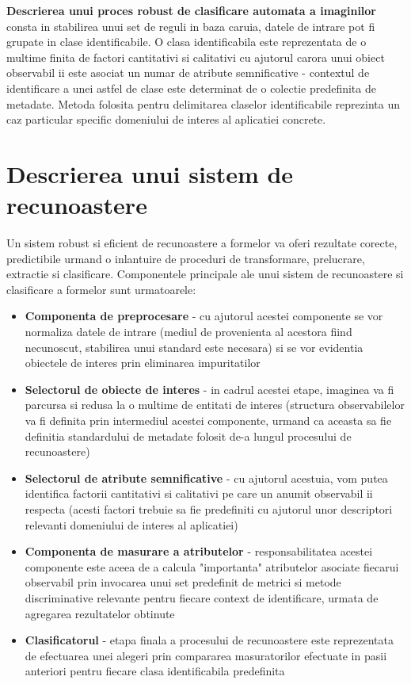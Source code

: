 \documentclass[10pt]{article}
\begin{document}
\> {\bf Descrierea unui proces robust de clasificare automata a imaginilor} consta in
stabilirea unui set de reguli in baza caruia, datele de intrare pot fi grupate in clase
identificabile. O clasa identificabila este reprezentata de o multime finita de factori
cantitativi si calitativi cu ajutorul carora unui obiect observabil ii este asociat un numar de
atribute semnificative - contextul de identificare a unei astfel de clase este determinat de o colectie
predefinita de metadate. Metoda folosita pentru delimitarea claselor identificabile reprezinta un
caz particular specific domeniului de interes al aplicatiei concrete. 

\newpage

\section{Descrierea unui sistem de recunoastere}\label{sec:2}

\> Un sistem robust si eficient de recunoastere a formelor va oferi rezultate corecte, predictibile
urmand o inlantuire de proceduri de transformare, prelucrare, extractie si clasificare.
Componentele principale ale unui sistem de recunoastere si clasificare a formelor sunt urmatoarele:

\begin{itemize}
    \item {\bf Componenta de preprocesare} - cu ajutorul acestei componente se vor normaliza datele de intrare
	(mediul de provenienta al acestora fiind necunoscut, stabilirea unui standard este necesara)
	si se vor evidentia obiectele de interes prin eliminarea impuritatilor
	\item {\bf Selectorul de obiecte de interes} - in cadrul acestei etape, imaginea va fi parcursa
	si redusa la o multime de entitati de interes (structura observabilelor va fi definita
	prin intermediul acestei componente, urmand ca aceasta sa fie definitia standardului de metadate
	folosit de-a lungul procesului de recunoastere)
    \item {\bf Selectorul de atribute semnificative} - cu ajutorul acestuia, vom putea identifica
    factorii cantitativi si calitativi pe care un anumit observabil ii respecta (acesti factori trebuie sa fie predefiniti
	cu ajutorul unor descriptori relevanti domeniului de interes al aplicatiei)
    \item {\bf Componenta de masurare a atributelor} - responsabilitatea acestei componente este aceea de
    a calcula "importanta" atributelor asociate fiecarui observabil prin invocarea unui set
	predefinit de metrici si metode discriminative relevante pentru fiecare context de identificare, urmata
	de agregarea rezultatelor obtinute
    \item {\bf Clasificatorul} - etapa finala a procesului de recunoastere este reprezentata de
    efectuarea unei alegeri prin compararea masuratorilor efectuate in pasii anteriori pentru fiecare clasa
	identificabila predefinita
\end{itemize}
\end{document}
